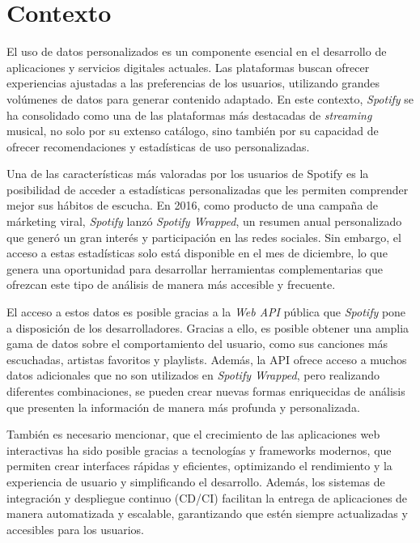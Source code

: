 \section{Contexto}

El uso de datos personalizados es un componente esencial en el desarrollo de aplicaciones y servicios digitales actuales. Las plataformas buscan ofrecer experiencias ajustadas a las preferencias de los usuarios, utilizando grandes volúmenes de datos para generar contenido adaptado. En este contexto, \textit{Spotify} se ha consolidado como una de las plataformas más destacadas de \textit{streaming} musical, no solo por su extenso catálogo, sino también por su capacidad de ofrecer recomendaciones y estadísticas de uso personalizadas.

Una de las características más valoradas por los usuarios de Spotify es la posibilidad de acceder a estadísticas personalizadas que les permiten comprender mejor sus hábitos de escucha. En 2016, como producto de una campaña de márketing viral, \textit{Spotify} lanzó \textit{Spotify Wrapped}, un resumen anual personalizado que generó un gran interés y participación en las redes sociales. Sin embargo, el acceso a estas estadísticas solo está disponible en el mes de diciembre, lo que genera una oportunidad para desarrollar herramientas complementarias que ofrezcan este tipo de análisis de manera más accesible y frecuente.

El acceso a estos datos es posible gracias a la \textit{Web API} pública que \textit{Spotify} pone a disposición de los desarrolladores. Gracias a ello, es posible obtener una amplia gama de datos sobre el comportamiento del usuario, como sus canciones más escuchadas, artistas favoritos y playlists. Además, la API ofrece acceso a muchos datos adicionales que no son utilizados en \textit{Spotify Wrapped}, pero realizando diferentes combinaciones, se pueden crear nuevas formas enriquecidas de análisis que presenten la información de manera más profunda y personalizada.

También es necesario mencionar, que el crecimiento de las aplicaciones web interactivas ha sido posible gracias a tecnologías y frameworks modernos, que permiten crear interfaces rápidas y eficientes, optimizando el
rendimiento y la experiencia de usuario y simplificando el desarrollo. Además, los sistemas de integración y despliegue continuo (CD/CI) facilitan la entrega de aplicaciones de manera automatizada y escalable, garantizando que estén siempre actualizadas y accesibles para los usuarios.

